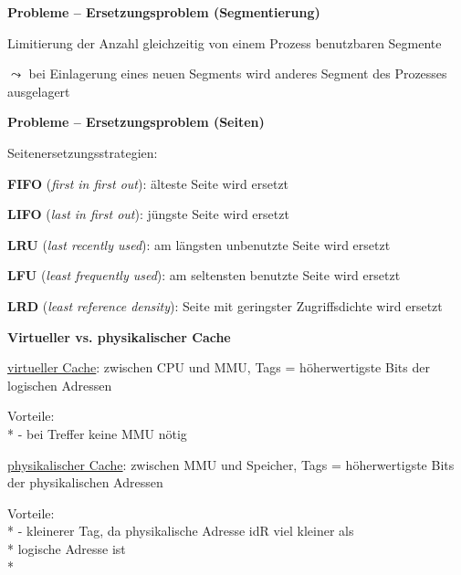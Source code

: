 \textbf{Probleme -- Ersetzungsproblem (Segmentierung)}
\begin{items}
  \item Limitierung der Anzahl gleichzeitig von einem Prozess benutzbaren Segmente
  \item \( \leadsto \) bei Einlagerung eines neuen Segments wird anderes Segment des Prozesses ausgelagert
\end{items}

\textbf{Probleme -- Ersetzungsproblem (Seiten)}
\begin{items}
  \item Seitenersetzungsstrategien:
  \begin{enumeration}
    \item \textbf{FIFO} (\emph{first in first out}): älteste Seite wird ersetzt
    \item \textbf{LIFO} (\emph{last in first out}): jüngste Seite wird ersetzt
    \item \textbf{LRU} (\emph{last recently used}): am längsten unbenutzte Seite wird ersetzt
    \item \textbf{LFU} (\emph{least frequently used}): am seltensten benutzte Seite wird ersetzt
    \item \textbf{LRD} (\emph{least reference density}): Seite mit geringster Zugriffsdichte wird ersetzt
  \end{enumeration}
\end{items}

\textbf{Virtueller vs. physikalischer Cache}
\begin{items}
  \item \underline{virtueller Cache}: zwischen CPU und MMU, Tags = höherwertigste Bits der logischen Adressen
  \item Vorteile: \\*
    - bei Treffer keine MMU nötig
  \item \underline{physikalischer Cache}: zwischen MMU und Speicher, Tags = höherwertigste Bits der physikalischen Adressen
  \item Vorteile: \\*
    - kleinerer Tag, da physikalische Adresse idR viel kleiner als \\* \phantom{-} logische Adresse ist \\*
\end{items}

